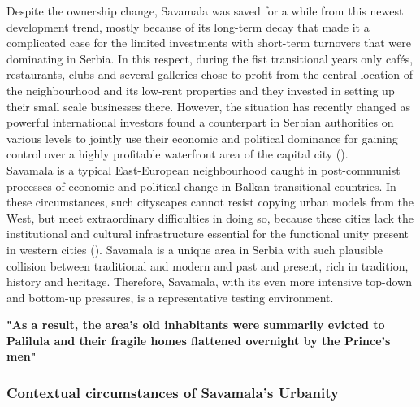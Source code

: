 \documentclass[11pt]{report}
\begin{document}
Despite the ownership change, Savamala was saved for a while from this newest development trend, mostly because of its long-term decay that made it a complicated case for the limited investments with short-term turnovers that were dominating in Serbia.
In this respect, during the fist transitional years only cafés, restaurants, clubs and several galleries chose to profit from the central location of the neighbourhood and its low-rent properties and they invested in setting up their small scale businesses there.
However, the situation has recently changed as powerful international investors found a counterpart in Serbian authorities on various levels to jointly use their economic and political dominance for gaining control over a highly profitable waterfront area of the capital city (\cite{Zekovic et al., 2016}).
\\
Savamala is a typical East-European neighbourhood caught in post-communist processes of economic and political change in Balkan transitional countries.
In these circumstances, such cityscapes cannot resist copying urban models from the West, but meet extraordinary difficulties in doing so, because these cities lack the institutional and cultural infrastructure essential for the functional unity present in western cities (\href{}{\citealt{petrovic_cities_2009}}).
Savamala is a unique area in Serbia with such plausible collision between traditional and modern and past and present, rich in tradition, history and heritage.
Therefore, Savamala, with its even more intensive top-down and bottom-up pressures, is a representative testing environment.

\textbf{"As a result, the area's old inhabitants were summarily evicted to Palilula  and their fragile homes flattened overnight by the Prince's men" \cite{bureau savamala}}

\subsubsection{Contextual circumstances of Savamala's Urbanity}
\end{document}
